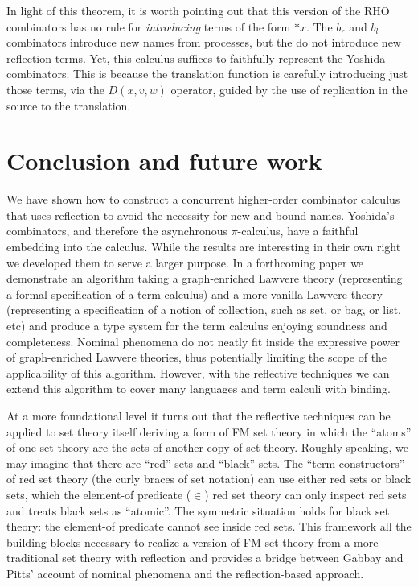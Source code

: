 \documentclass{llncs}
\newcommand{\pic}{$\pi$-calculus}
\newcommand{\dropn}[1]{\mathsf{*}#1}
\begin{document}
\begin{remark}
  In light of this theorem, it is worth pointing out that this version
  of the RHO combinators has no rule for \emph{introducing} terms of
  the form $\dropn{x}$. The $b_r$ and $b_l$ combinators introduce new
  names from processes, but the do not introduce new reflection
  terms. Yet, this calculus suffices to faithfully represent the
  Yoshida combinators. This is because the translation function is
  carefully introducing just those terms, via the $D(x,v,w)$ operator,
  guided by the use of replication in the source to the
  translation. 
\end{remark}

\section{Conclusion and future work}
We have shown how to construct a concurrent higher-order combinator
calculus that uses reflection to avoid the necessity for new and bound
names.  Yoshida's combinators, and therefore the asynchronous {\pic},
have a faithful embedding into the calculus. While the results are
interesting in their own right we developed them to serve a larger
purpose. In a forthcoming paper we demonstrate an algorithm taking a
graph-enriched Lawvere theory (representing a formal specification of
a term calculus) and a more vanilla Lawvere theory (representing a
specification of a notion of collection, such as set, or bag, or list,
etc) and produce a type system for the term calculus enjoying
soundness and completeness. Nominal phenomena do not neatly fit inside
the expressive power of graph-enriched Lawvere theories, thus
potentially limiting the scope of the applicability of this
algorithm. However, with the reflective techniques we can extend this
algorithm to cover many languages and term calculi with binding.

At a more foundational level it turns out that the reflective
techniques can be applied to set theory itself deriving a form of FM
set theory in which the ``atoms'' of one set theory are the sets of
another copy of set theory. Roughly speaking, we may imagine that
there are ``red'' sets and ``black'' sets. The ``term constructors''
of red set theory (the curly braces of set notation) can use either
red sets or black sets, which the element-of predicate ($\in$) red set
theory can only inspect red sets and treats black sets as
``atomic''. The symmetric situation holds for black set theory: the
element-of predicate cannot see inside red sets. This framework all
the building blocks necessary to realize a version of FM set theory
from a more traditional set theory with reflection and provides a
bridge between Gabbay and Pitts' account of nominal phenomena and the
reflection-based approach.
\end{document}
